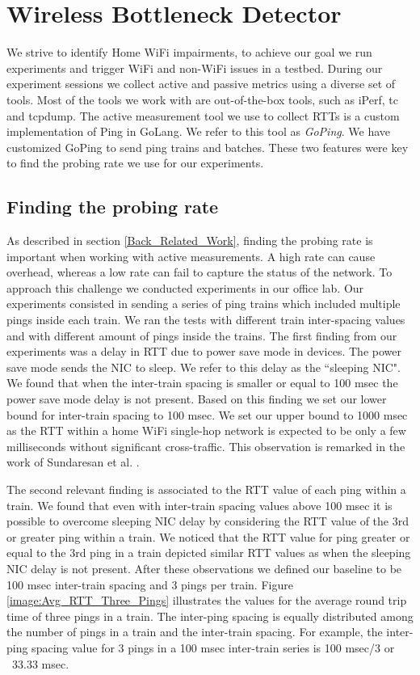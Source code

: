 \section{Wireless Bottleneck Detector}\label{Wireless Bottleneck Detector}

We strive to identify Home WiFi impairments, to achieve our goal we run experiments and trigger WiFi and non-WiFi issues in a testbed.  During our experiment sessions we collect active and passive metrics using a diverse set of tools. Most of the tools we work with are out-of-the-box tools, such as iPerf, tc and tcpdump. The active measurement tool we use to collect RTTs is a custom implementation of Ping in GoLang. We refer to this tool as \emph{GoPing}. We have customized GoPing to send ping trains and batches. These two features were key to find the probing rate we use for our experiments.

\subsection{Finding the probing rate}\label{probing_rate}

As described in section \ref{Back_Related_Work}, finding the probing rate is important when working with active measurements. A high rate can cause overhead, whereas a low rate can fail to capture the status of the network. To approach this challenge we conducted experiments in our office lab. Our experiments consisted in sending a series of ping trains which included multiple pings inside each train. We ran the tests with different train inter-spacing values and with different amount of pings inside the trains. The first finding from our experiments was a delay in RTT due to power save mode in devices. The power save mode sends the NIC to sleep. We refer to this delay as the ``sleeping NIC". We found that when the inter-train spacing is smaller or equal to 100 msec the power save mode delay is not present. Based on this finding we set our lower bound for inter-train spacing to 100 msec. We set our upper bound to 1000 msec as the RTT within a home WiFi single-hop network is expected to be only a few milliseconds without significant cross-traffic. This observation is remarked in the work of Sundaresan et al. \cite{homeoraccesslink}.

The second relevant finding is associated to the RTT value of each ping within a train. We found that even with inter-train spacing values above 100 msec it is possible to overcome sleeping NIC delay by considering the RTT value of the 3rd or greater ping within a train. We noticed that the RTT value for ping greater or equal to the 3rd ping in a train depicted similar RTT values as when the sleeping NIC delay is not present. After these observations we defined our baseline to be 100 msec inter-train spacing and 3 pings per train. Figure \ref{image:Avg_RTT_Three_Pings} illustrates the values for the average round trip time of three pings in a train. The inter-ping spacing is equally distributed among the number of pings in a train and the inter-train spacing. For example, the inter-ping spacing value for 3 pings in a 100 msec inter-train series is 100 msec/3 or ~33.33 msec.

